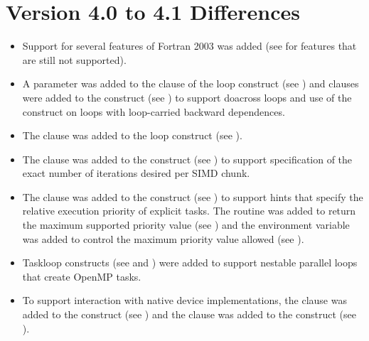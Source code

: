 \section{Version 4.0 to 4.1 Differences}
\label{sec:Version 4.0 to 4.1 Differences}
\begin{itemize}
\item Support for several features of Fortran 2003 was added (see 
       for features that are still 
      not supported).

\item A parameter was added to the  clause of the loop construct 
      (see ) and clauses were added to the 
       construct (see ) to 
      support doacross loops and use of the  construct on loops 
      with loop-carried backward dependences. 

\item The  clause was added to the loop construct 
      (see ).

\item The  clause was added to the  construct
      (see ) to support specification of 
      the exact number of iterations desired per SIMD chunk. 

\item The  clause was added to the  construct
      (see ) to support hints that specify
      the relative execution priority of explicit tasks. The 
       routine was added to return
      the maximum supported priority value (see 
      ) and the 
       environment variable was added to
      control the maximum priority value allowed (see 
      ).

\item Taskloop constructs (see  and 
      ) were added to support 
      nestable parallel loops that create OpenMP tasks. 

\item To support interaction with native device implementations, the 
       clause was added to the 
      construct (see ) and the 
       clause was added to the  construct
      (see ).


\end{itemize}
